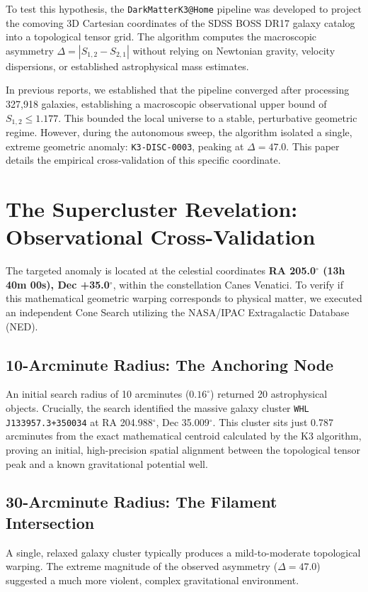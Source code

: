 \documentclass[aps,prd,twocolumn,nofootinbib,superscriptaddress,10pt]{revtex4-2}
\begin{document}
To test this hypothesis, the \texttt{DarkMatterK3@Home} pipeline was developed to project the comoving 3D Cartesian coordinates of the SDSS BOSS DR17 galaxy catalog into a topological tensor grid. The algorithm computes the macroscopic asymmetry $\Delta = |S_{1,2} - S_{2,1}|$ without relying on Newtonian gravity, velocity dispersions, or established astrophysical mass estimates.

In previous reports, we established that the pipeline converged after processing 327,918 galaxies, establishing a macroscopic observational upper bound of $S_{1,2} \le 1.177$. This bounded the local universe to a stable, perturbative geometric regime. However, during the autonomous sweep, the algorithm isolated a single, extreme geometric anomaly: \texttt{K3-DISC-0003}, peaking at $\Delta = 47.0$. This paper details the empirical cross-validation of this specific coordinate.

\section{The Supercluster Revelation: Observational Cross-Validation}

The targeted anomaly is located at the celestial coordinates \textbf{RA 205.0$^\circ$ (13h 40m 00s), Dec +35.0$^\circ$}, within the constellation Canes Venatici. To verify if this mathematical geometric warping corresponds to physical matter, we executed an independent Cone Search utilizing the NASA/IPAC Extragalactic Database (NED).

\subsection{10-Arcminute Radius: The Anchoring Node}
An initial search radius of 10 arcminutes ($0.16^\circ$) returned 20 astrophysical objects. Crucially, the search identified the massive galaxy cluster \texttt{WHL J133957.3+350034} at RA 204.988$^\circ$, Dec 35.009$^\circ$. This cluster sits just 0.787 arcminutes from the exact mathematical centroid calculated by the K3 algorithm, proving an initial, high-precision spatial alignment between the topological tensor peak and a known gravitational potential well.

\subsection{30-Arcminute Radius: The Filament Intersection}
A single, relaxed galaxy cluster typically produces a mild-to-moderate topological warping. The extreme magnitude of the observed asymmetry ($\Delta = 47.0$) suggested a much more violent, complex gravitational environment. 
\end{document}
